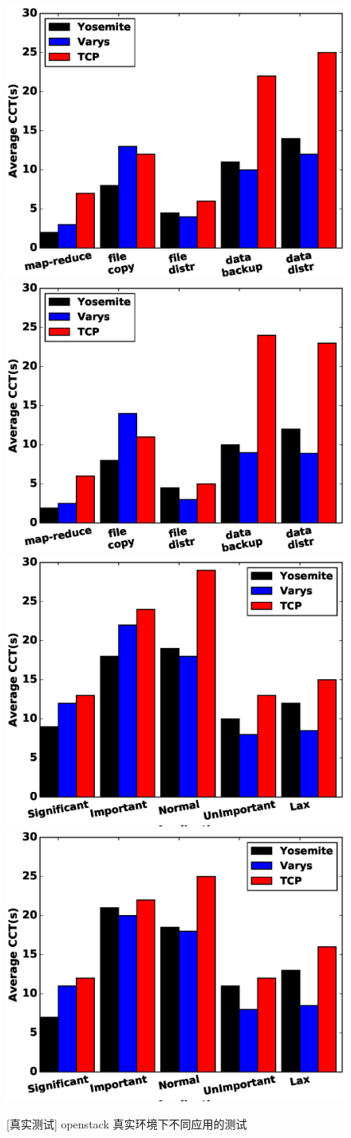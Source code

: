 \begin{figure}[h]
  \centering%
    {\includegraphics[width=0.5\columnwidth]{figures/Yosemite/figs/evaluation/ex5/real1.eps}}%
      {\includegraphics[width=0.5\columnwidth]{figures/Yosemite/figs/evaluation/ex5/real2.eps}}
    {\includegraphics[width=0.5\columnwidth]{figures/Yosemite/figs/evaluation/ex5/real3.eps}}%
      {\includegraphics[width=0.5\columnwidth]{figures/Yosemite/figs/evaluation/ex5/real4.eps}}
  \caption{[真实测试] openstack 真实环境下不同应用的测试}
  \label{Yosemite-evaluation_cloud_fig}
\end{figure}
